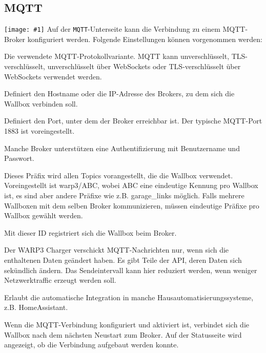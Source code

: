 \documentclass[a4paper,10pt]{article}
\newcommand{\gfx}[1]{\texttt{[image: \#1]}}
\begin{document}
\begin{multicols*}{2}
    \subsection{MQTT}\label{mqtt-interface}

    \gfx{./img_warp3/resized/web_mqtt}
    Auf der \texttt{MQTT}-Unterseite kann die Verbindung zu einem MQTT-Broker konfiguriert werden. Folgende Einstellungen können vorgenommen werden:
    \begin{description}[labelindent=0.5cm, leftmargin=0.5cm]
        \item[Protokoll] Die verwendete MQTT-Protokollvariante. MQTT kann unverschlüsselt, TLS-verschlüsselt, unverschlüsselt über WebSockets oder TLS-verschlüsselt über WebSockets verwendet werden.
        \item[Broker-Hostname oder -IP-Adresse] Definiert den Hostname oder die IP-Adresse des Brokers, zu dem sich die Wallbox verbinden soll.
        \item[Broker-Port] Definiert den Port, unter dem der Broker erreichbar ist. Der typische MQTT-Port 1883 ist voreingestellt.
        \item[Broker-Benutzername und -Passwort] Manche Broker unterstützen eine Authentifizierung mit Benutzername und Passwort.
        \item[Topic-Präfix] Dieses Präfix wird allen Topics vorangestellt, die die Wallbox verwendet.
              Voreingestellt ist warp3/ABC, wobei ABC eine eindeutige Kennung pro Wallbox ist,
              es sind aber andere Präfixe wie z.B. garage\_links möglich.
              Falls mehrere Wallboxen mit dem selben Broker kommunizieren,
              müssen eindeutige Präfixe pro Wallbox gewählt werden.
        \item[Client-ID] Mit dieser ID registriert sich die Wallbox beim Broker.
        \item[Sendeintervall] Der WARP3 Charger verschickt MQTT-Nachrichten nur, wenn sich die enthaltenen Daten geändert haben.
            Es gibt Teile der API, deren Daten sich sekündlich ändern. Das Sendeintervall kann hier reduziert werden, wenn weniger Netzwerktraffic
            erzeugt werden soll.
        \item[Discovery] Erlaubt die automatische Integration in manche Hausautomatisierungssysteme, z.B. HomeAssistant.
    \end{description}
    Wenn die MQTT-Verbindung konfiguriert und aktiviert ist, verbindet sich die Wallbox nach dem nächsten Neustart zum Broker. Auf der Statusseite wird angezeigt, ob die Verbindung aufgebaut werden konnte.


\end{multicols*}
\end{document}
